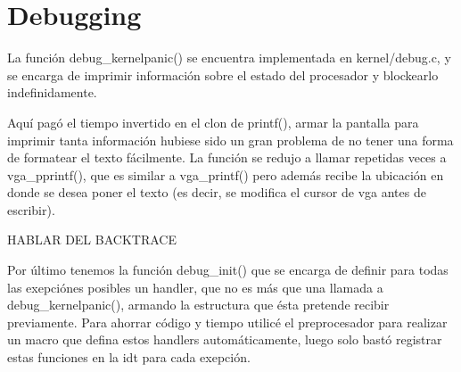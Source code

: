 \section{Debugging}

La función debug\_kernelpanic() se encuentra implementada en kernel/debug.c, y
se encarga de imprimir información sobre el estado del procesador y blockearlo
indefinidamente.

Aquí pagó el tiempo invertido en el clon de printf(), armar la pantalla para
imprimir tanta información hubiese sido un gran problema de no tener una forma
de formatear el texto fácilmente. La función se redujo a llamar repetidas veces
a vga\_pprintf(), que es similar a vga\_printf() pero además recibe la
ubicación en donde se desea poner el texto (es decir, se modifica el cursor de
vga antes de escribir).

HABLAR DEL BACKTRACE

Por último tenemos la función debug\_init() que se encarga de definir para
todas las exepciónes posibles un handler, que no es más que una llamada a
debug\_kernelpanic(), armando la estructura que ésta pretende recibir
previamente. Para ahorrar código y tiempo utilicé el preprocesador para
realizar un macro que defina estos handlers automáticamente, luego solo bastó
registrar estas funciones en la idt para cada exepción.
